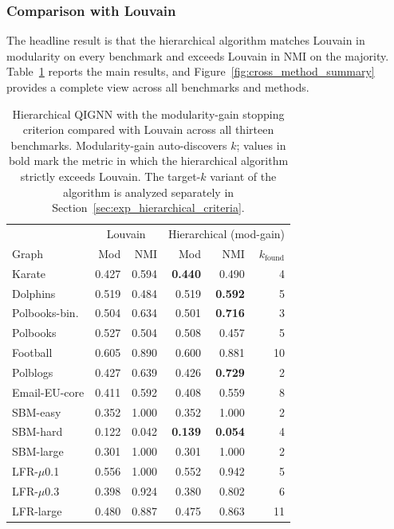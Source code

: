 \subsubsection{Comparison with Louvain}
\label{sec:exp_hierarchical_results}

The headline result is that the hierarchical algorithm matches
Louvain in modularity on every benchmark and exceeds Louvain in
NMI on the majority. Table~\ref{tab:hier_main} reports the main
results, and Figure~\ref{fig:cross_method_summary} provides a
complete view across all benchmarks and methods.

\begin{table}[H]
    \caption{Hierarchical QIGNN with the modularity-gain stopping
    criterion compared with Louvain across all thirteen benchmarks.
    Modularity-gain auto-discovers $k$; values in bold mark the
    metric in which the hierarchical algorithm strictly exceeds
    Louvain. The target-$k$ variant of the algorithm is analyzed
    separately in
    Section~\ref{sec:exp_hierarchical_criteria}.}
    \label{tab:hier_main}
    \centering
    \small
    \begin{tabular}{lrr|rrr}
        \toprule
         & \multicolumn{2}{c|}{Louvain} & \multicolumn{3}{c}{Hierarchical (mod-gain)} \\
        Graph & Mod & NMI & Mod & NMI & $k_{\mathrm{found}}$ \\
        \midrule
        Karate          & 0.427 & 0.594 & \textbf{0.440} & 0.490 & 4 \\
        Dolphins        & 0.519 & 0.484 & 0.519 & \textbf{0.592} & 5 \\
        Polbooks-bin.   & 0.504 & 0.634 & 0.501 & \textbf{0.716} & 3 \\
        Polbooks        & 0.527 & 0.504 & 0.508 & 0.457 & 5 \\
        Football        & 0.605 & 0.890 & 0.600 & 0.881 & 10 \\
        Polblogs        & 0.427 & 0.639 & 0.426 & \textbf{0.729} & 2 \\
        Email-EU-core   & 0.411 & 0.592 & 0.408 & 0.559 & 8 \\
        SBM-easy        & 0.352 & 1.000 & 0.352 & 1.000 & 2 \\
        SBM-hard        & 0.122 & 0.042 & \textbf{0.139} & \textbf{0.054} & 4 \\
        SBM-large       & 0.301 & 1.000 & 0.301 & 1.000 & 2 \\
        LFR-$\mu$0.1    & 0.556 & 1.000 & 0.552 & 0.942 & 5 \\
        LFR-$\mu$0.3    & 0.398 & 0.924 & 0.380 & 0.802 & 6 \\
        LFR-large       & 0.480 & 0.887 & 0.475 & 0.863 & 11 \\
        \bottomrule
    \end{tabular}
\end{table}

